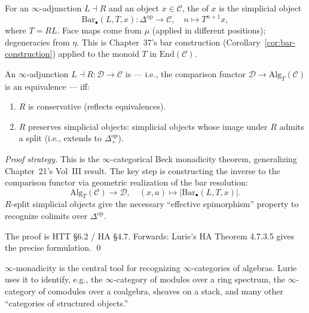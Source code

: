 \begin{definition}
\label{def:bar-simplicial}
For an $\infty$-adjunction $L \dashv R$ and an object $x \in \mathcal{C}$,
the  of $x$ is the simplicial object
\begin{equation*}
  \mathrm{Bar}_\bullet(L, T, x) : \Delta^{\mathrm{op}} \to \mathcal{C}, \quad
  n \mapsto T^{n+1} x,
\end{equation*}
where $T = RL$. Face maps come from $\mu$ (applied in different positions);
degeneracies from $\eta$. This is Chapter~37's bar construction
(Corollary~\ref{cor:bar-construction}) applied to the monoid $T$ in
$\mathrm{End}(\mathcal{C})$.
\end{definition}

\begin{theorem}
\label{thm:infty-monadicity}
An $\infty$-adjunction $L \dashv R : \mathcal{D} \to \mathcal{C}$ is
 — i.e., the comparison functor $\mathcal{D} \to
\mathrm{Alg}_T(\mathcal{C})$ is an equivalence — iff:
\begin{enumerate}
  \item $R$ is conservative (reflects equivalences).
  \item $R$ preserves  simplicial objects: simplicial
        objects whose image under $R$ admits a split (i.e., extends to
        $\Delta_+^{\mathrm{op}}$).
\end{enumerate}
\end{theorem}

\begin{proof}[Proof strategy]
This is the $\infty$-categorical Beck monadicity theorem, generalizing
Chapter~21's Vol~III result. The key step is constructing the inverse
to the comparison functor via geometric realization of the bar resolution:
\begin{equation*}
  \mathrm{Alg}_T(\mathcal{C}) \to \mathcal{D}, \quad (x, a) \mapsto
  |\mathrm{Bar}_\bullet(L, T, x)|.
\end{equation*}
$R$-split simplicial objects give the necessary ``effective epimorphism''
property to recognize colimits over $\Delta^{\mathrm{op}}$.

The proof is HTT §6.2 / HA §4.7. Forwards: Lurie's HA Theorem 4.7.3.5
gives the precise formulation.
\qed
\end{proof}

\begin{remark}
$\infty$-monadicity is the central tool for recognizing $\infty$-categories
of algebras. Lurie uses it to identify, e.g., the $\infty$-category of
modules over a ring spectrum, the $\infty$-category of comodules over a
coalgebra, sheaves on a stack, and many other ``categories of
structured objects.''
\end{remark}


